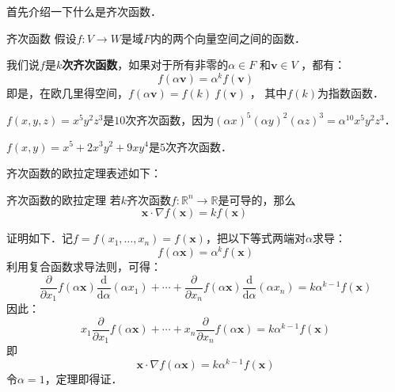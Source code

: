 
首先介绍一下什么是齐次函数．

\begin{definition}{齐次函数}
假设$f: V \to W $是域$ F $内的两个向量空间之间的函数．

我们说$f$是$k$\textbf{次齐次函数}，如果对于所有非零的$\alpha \in F$ 和$\mathbf{v} \in V$ ，都有：
\begin{equation}
f(\alpha \mathbf{v}) = \alpha^k f(\mathbf{v}) 
\end{equation}
即是，在欧几里得空间，$f(\alpha \mathbf{v}) = f(k) \ f(\mathbf{v})$ ， 其中$f(k)$为指数函数．
\end{definition}

\begin{example}{}
$f(x,y,z)=x^5y^2z^3$是$10$次齐次函数，因为$(\alpha x)^5(\alpha y)^2(\alpha z)^3=\alpha^{10}x^5y^2z^3$．

$f(x,y)=x^5 + 2 x^3 y^2 + 9 x y^4$是$5$次齐次函数．
\end{example}

齐次函数的欧拉定理表述如下：

\begin{theorem}{齐次函数的欧拉定理}
若$k$齐次函数$ f:\mathbb{R}^n \to \mathbb{R}$是可导的，那么
\begin{equation}
{\displaystyle \mathbf {x} \cdot \nabla f(\mathbf {x} )=kf(\mathbf {x} )\qquad }
\end{equation}

证明如下．记$f=f(x_{1},\ldots ,x_{n})=f(\mathbf {x} )$，把以下等式两端对$\alpha$求导：
\begin{equation}
{\displaystyle f(\alpha \mathbf {x} )=\alpha ^{k}f(\mathbf {x} )}
\end{equation}
利用复合函数求导法则，可得：
\begin{equation}
{\frac {\partial }{\partial x_{1}}}f(\alpha \mathbf {x} ){\frac {\mathrm {d} }{\mathrm {d} \alpha }}(\alpha x_{1})+\cdots +{\frac {\partial }{\partial x_{n}}}f(\alpha \mathbf {x} ){\frac {\mathrm {d} }{\mathrm {d} \alpha }}(\alpha x_{n})=k\alpha ^{k-1}f(\mathbf {x} )
\end{equation}
因此：
\begin{equation}
x_{1}{\frac {\partial }{\partial x_{1}}}f(\alpha \mathbf {x} )+\cdots +x_{n}{\frac {\partial }{\partial x_{n}}}f(\alpha \mathbf {x} )=k\alpha ^{k-1}f(\mathbf {x} )
\end{equation}
即
\begin{equation}
\mathbf {x} \cdot \nabla f(\alpha \mathbf {x} )=k\alpha ^{k-1}f(\mathbf {x} )
\end{equation}
令$\alpha=1$，定理即得证．
\end{theorem}

